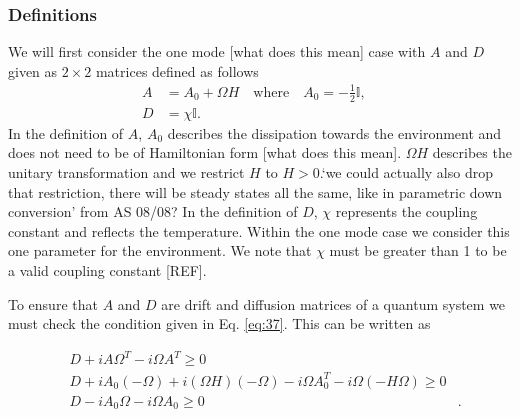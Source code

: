 \documentclass[11pt,a4paper]{article}
\numberwithin{equation}{section}
\begin{document}
	\subsubsection{Definitions}
	\label{sec:onemodedefs}
	We will first consider the one mode \color{blue}[what does this mean] \color{black}case with $A$ and $D$ given as $2 \times 2$ matrices defined as follows
	\begin{align*}
	A &= A_0 + \Omega H \quad\text{where}\quad A_0 = -\frac{1}{2}\mathbb{I},&\\
	D &= \chi \mathbb{I}.&
	\end{align*}
	In the definition of $A$, $A_0$ describes the dissipation towards the environment and does not need to be of Hamiltonian form \color{blue}[what does this mean]\color{black}. $\Omega H$ describes the unitary transformation and we restrict $H$ to $H>0$.\color{blue}`we could actually also drop that restriction, there will be steady states all the same, like in parametric down conversion' from AS 08/08? \color{black} In the definition of $D$, $\chi$ represents the coupling constant and reflects the temperature. Within the one mode case we consider this one parameter for the environment. \color{red}We note that $\chi$ must be greater than 1 to be a valid coupling constant [REF]. \color{black} 
	
	To ensure that $A$ and $D$ are drift and diffusion matrices of a quantum system we must check the condition given in Eq. \ref{eq:37}. This can be written as
	
	\begin{align} 
	&D + iA \Omega^T - i\Omega A^T \geq 0& \nonumber\\
	&D + iA_0 (-\Omega) + i (\Omega H) (-\Omega) - i\Omega A_{0}^{T} - i\Omega (-H\Omega) \geq 0& \nonumber\\
	&D - iA_0 \Omega - i\Omega A_0 \geq 0& \label{eq:42}.
	\end{align}
	
\end{document}
